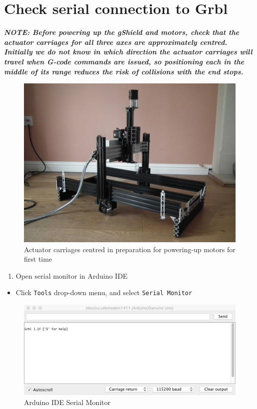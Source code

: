 \documentclass[]{book}
\providecommand{\tightlist}{%
  \setlength{\itemsep}{0pt}\setlength{\parskip}{0pt}}
\theoremstyle{definition}
\theoremstyle{definition}
\theoremstyle{remark}
\begin{document}
\section{Check serial connection to
Grbl}\label{check-serial-connection-to-grbl}

\emph{\textbf{NOTE: Before powering up the gShield and motors, check
that the actuator carriages for all three axes are approximately
centred. Initially we do not know in which direction the actuator
carriages will travel when G-code commands are issued, so positioning
each in the middle of its range reduces the risk of collisions with the
end stops.}}

\begin{figure}

{\centering \includegraphics[width=0.75\linewidth]{images/actuator_carriages_centred} 

}

\caption{Actuator carriages centred in preparation for powering-up motors for first time}\label{fig:actuatorsCentred}
\end{figure}

\begin{enumerate}
\def\labelenumi{\arabic{enumi}.}
\tightlist
\item
  Open serial monitor in Arduino IDE
\end{enumerate}

\begin{itemize}
\tightlist
\item
  Click \texttt{Tools} drop-down menu, and select
  \texttt{Serial\ Monitor}
\end{itemize}

\begin{figure}

{\centering \includegraphics[width=0.75\linewidth]{images/Arduino_IDE_serial_monitor} 

}

\caption{Arduino IDE Serial Monitor}\label{fig:serialMonitor}
\end{figure}
\end{document}
